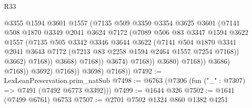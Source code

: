 \begin{lexlean}{R33}
\begin{coremodule}
                                      @3355
                                      @1594
                                      @3601
                                      @1557
                                      (@7135
                                        @509
                                        @3350
                                        @3354
                                        @3625
                                        @3601
                                        (@7141
                                          @508
                                          @1870
                                          @3349
                                          @2041
                                          @3624
                                          @7172
                                          (@7089
                                            @506
                                            @83
                                            @3347
                                            @1594
                                            @3622
                                            @1557
                                            (@7135
                                              @505
                                              @3342
                                              @3346
                                              @3644
                                              @3622
                                              (@7141
                                                @504
                                                @1870
                                                @3341
                                                @2041
                                                @3643
                                                @7172
                                                (@7213 @83 @2258 @1594 @2464 @1557 @7254 @7168))
                                              @3662)
                                            @7168))
                                        @3668)
                                      @7168))
                                  @3674)
                                @7168))
                            @3680)
                          @7168))
                      @3686)
                    @7168))
                @3692)
              @7168))
          @3698)
        @7168))
@7492 := LexLeanPreservation.prim_natSub
@7498 := @6763 (@7306 (fun ("_" : @7307) => @7491 (@7492 @6773 @3392)))
@7499 := @1644 @326
@7502 := @1641 (@7499 @6761) @6753
@7507 := @2701 @7502 @1324 @860 @1382 @4251

\end{coremodule}
\end{lexlean}
